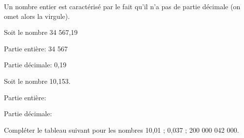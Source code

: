 Un nombre entier est caractérisé par le fait qu'il n'a pas de partie décimale (on omet alors la virgule).


\begin{methode*1}
\begin{exemple*1}

Soit le nombre 34 567,19

\hspace{2em}\textbullet\hspace{.25em} Partie entière: 34 567
 
\hspace{2em}\textbullet\hspace{.25em} Partie décimale: 0,19


\end{exemple*1}

\exercice

Soit le nombre 10,153.

\hspace{2em}\textbullet\hspace{.25em}Partie entière: \dotfill

\hspace{2em}\textbullet\hspace{.25em} Partie décimale:\dotfill

\exercice

Compléter le tableau suivant pour les nombres 10,01 ; 0,037 ; 200 000 042 000.

\vspace{2em}


\end{methode*1}
